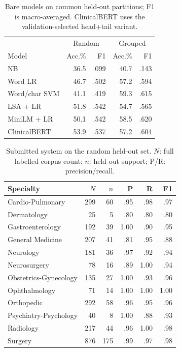 \documentclass[twocolumn,10pt]{article}
\begin{document}
\begin{table}[!ht]
\centering\small
\setlength{\tabcolsep}{3pt}
\begin{tabular}{lrrrr}
\toprule
& \multicolumn{2}{c}{Random} & \multicolumn{2}{c}{Grouped}\\
Model & Acc.\% & F1 & Acc.\% & F1\\\midrule
NB &36.5&.099&40.7&.143\\
Word LR &46.7&.502&57.2&.594\\
Word/char SVM &41.1&.419&59.3&.615\\
LSA + LR &51.8&.542&54.7&.565\\
MiniLM + LR &50.1&.542&58.5&.620\\
ClinicalBERT &53.9&.537&57.2&.604\\\bottomrule
\end{tabular}
\caption{Bare models on common held-out partitions; F1 is macro-averaged. ClinicalBERT uses the validation-selected head+tail variant.}\label{tab:models}
\end{table}

\begin{table}[!ht]
\centering\small\setlength{\tabcolsep}{3pt}
\begin{tabular}{lrrrrr}
\toprule
Specialty & $N$ & $n$ & P & R & F1\\\midrule
Cardio-Pulmonary &299&60&.95&.98&.97\\
Dermatology &25&5&.80&.80&.80\\
Gastroenterology &192&39&1.00&.90&.95\\
General Medicine &207&41&.81&.95&.88\\
Neurology &181&36&.97&.92&.94\\
Neurosurgery &78&16&.89&1.00&.94\\
Obstetrics-Gynecology &135&27&1.00&.93&.96\\
Ophthalmology &71&14&1.00&1.00&1.00\\
Orthopedic &292&58&.96&.95&.96\\
Psychiatry-Psychology &40&8&1.00&.88&.93\\
Radiology &217&44&.96&1.00&.98\\
Surgery &876&175&.99&.97&.98\\\bottomrule
\end{tabular}
\caption{Submitted system on the random held-out set. $N$: full labelled-corpus count; $n$: held-out support; P/R: precision/recall.}\label{tab:classes}
\end{table}
\end{document}
